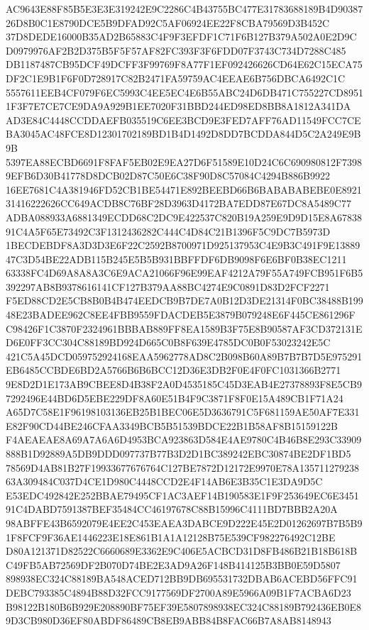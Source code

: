 \documentclass[UTF8,fontset=fandol,zihao=-4,a4paper]{ctexart}
\begin{document}
{{AC9643E88F85B5E3E3E319242E9C2286C4B43755BC477E31783688189B4D9038726D8B0C1E8790DCE5B9DFAD92C5AF06924EE22F8CBA79569D3B452C
37D8DEDE16000B35AD2B65883C4F9F3EFDF1C71F6B127B379A502A0E2D9CD0979976AF2B2D375B5F5F57AF82FC393F3F6FDD07F3743C734D7288C485
DB1187487CB95DCF49DCFF3F99769F8A77F1EF092426626CD64E62C15ECA75DF2C1E9B1F6F0D728917C82B2471FA59759AC4EEAE6B756DBCA6492C1C
5557611EEB4CF079F6EC5993C4EE5EC4E6B55ABC24D6DB471C755227CD89511F3F7E7CE7CE9DA9A929B1EE7020F31BBD244ED98ED8BB8A1812A341DA
AD3E84C4448CCDDAEFB035519C6EE3BCD9E3FED7AFF76AD11549FCC7CEBA3045AC48FCE8D12301702189BD1B4D1492D8DD7BCDDA844D5C2A249E9B9B
5397EA88ECBD6691F8FAF5EB02E9EA27D6F51589E10D24C6C690980812F73989EFB6D30B41778D8DCB02D87C50E6C38F90D8C57084C4294B886B9922
16EE7681C4A381946FD52CB1BE54471E892BEEBD66B6BABABABEBE0E892131416222626CC649ACDB8C76BF28D3963D4172BA7EDD87E67DC8A5489C77
ADBA088933A6881349ECDD68C2DC9E422537C820B19A259E9D9D15E8A6783891C4A5F65E73492C3F1312436282C444C4D84C21B1396F5C9DC7B5973D
1BECDEBDF8A3D3D3E6F22C2592B8700971D925137953C4E9B3C491F9E1388947C3D54BE22ADB115B245E5B5B931BBFFDF6DB9098F6E6BF0B38EC1211
63338FC4D69A8A8A3C6E9ACA21066F96E99EAF4212A79F55A749FCB951F6B5392297AB8B9378616141CF127B379AA88BC4274E9C0891D83D2FCF2271
F5ED88CD2E5CB8B0B4B474EEDCB9B7DE7A0B12D3DE21314F0BC38488B19948E23BADEE962C8EE4FBB9559FDACDEB5E3879B079248E6F445CE861296F
C98426F1C3870F2324961BBBAB889FF8EA1589B3F75E8B90587AF3CD372131ED6E0FF3CC304C88189BD924D665C0B8F639E4785DC0B0F53023242E5C
421C5A45DCD059752924168EAA5962778AD8C2B098B60A89B7B7B7D5E975291EB6485CCBDE6BD2A5766B6B6BCC12D36E3DB2F0E4F0FC1031366B2771
9E8D2D1E173AB9CBEE8D4B38F2A0D4535185C45D3EAB4E27378893F8E5CB97292496E44BD6D5EBE229DF8A60E51B4F9C3871F8F0E15A489CB1F71A24
A65D7C58E1F96198103136EB25B1BEC06E5D3636791C5F681159AE50AF7E331E82F90CD44BE246CFAA3349BCB5B51539BDCE22B1B58AF8B15159122B
F4AEAEAE8A69A7A6A6D4953BCA923863D584E4AE9780C4B46B8E293C33909888B1D92889A5DB9DDD097737B77B3D2D1BC389242EBC30874BE2DF1BD5
78569D4AB81B27F19933677676764C127BE7872D12172E9970E78A13571127923863A309484C037D4CE1D980C4448CCD2E4F14AB6E3B35C1E3DA9D5C
E53EDC492842E252BBAE79495CF1AC3AEF14B190583E1F9F253649EC6E345191C4DABD7591387BEF35484CC46197678C88B15996C4111BD7BBB2A20A
98ABFFE43B6592079E4EE2C453EAEA3DABCE9D222E45E2D01262697B7B5B91F8FCF9F36AE1446223E18E861B1A1A12128B75E539CF982276492C12BE
D80A121371D82522C6660689E3362E9C406E5ACBCD31D8FB486B21B18B618BC49FB5AB72569DF2B070D74BE2E3AD9A26F148B414125B3BB0E59D5807
898938EC324C88189BA548ACED712BB9DB695531732DBAB6ACEBD56FFC91DEBC793385C4894B88D32FCC9177569DF2700A89E5966A09B1F7ACBA6D23
B98122B180B6B929E208890BF75EF39E5807898938EC324C88189B792436EB0E89D3CB980D36EF80ABDF86489CB8EB9ABB84B8FAC66B7A8AB8148943
}}
\end{document}
